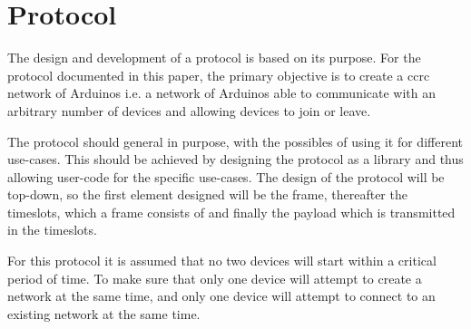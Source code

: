 \section{Protocol}
The design and development of a protocol is based on its purpose.
For the protocol documented in this paper, the primary objective is to create a \gls{ccrc} network of Arduinos i.e. a network of Arduinos able to communicate with an arbitrary number of devices and allowing devices to join or leave.

The protocol should general in purpose, with the possibles of using it for different use-cases.
This should be achieved by designing the protocol as a library and thus allowing user-code for the specific use-cases.
The design of the protocol will be top-down, so the first element designed will be the frame, thereafter the timeslots, which a frame consists of and finally the payload which is transmitted in the timeslots. 

For this protocol it is assumed that no two devices will start within a critical period of time.
To make sure that only one device will attempt to create a network at the same time, and only one device will attempt to connect to an existing network at the same time. 

